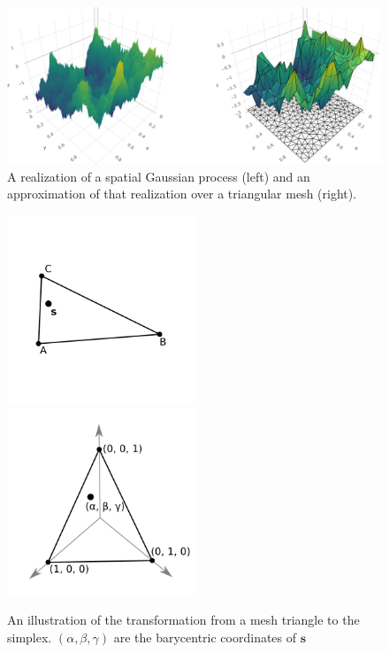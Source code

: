 \documentclass[]{interact}
\begin{document}



\begin{figure}[p]
\includegraphics[width=\textwidth]{figures/surface.png}
\caption{A realization of a spatial Gaussian process (left) and an
approximation of that realization over a triangular mesh (right).}
\label{surface}
\end{figure}

\begin{figure}[p]
\includegraphics[width=0.5\textwidth]{figures/triangle.png}
\includegraphics[width=0.5\textwidth]{figures/simplex.png}
\caption{An illustration of the transformation from a mesh triangle to the
simplex. \((\alpha, \beta, \gamma)\) are the barycentric coordinates of
\(\mathbf{s}\)}
\label{triangle}
\end{figure}
\end{document}
